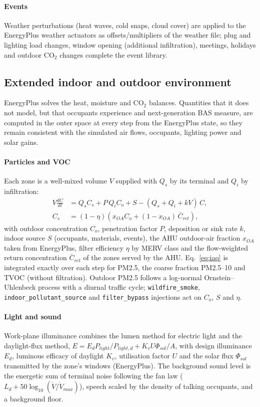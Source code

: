 \documentclass[preprint,12pt,authoryear=false]{elsarticle}
\begin{document}
\paragraph{Events} Weather perturbations (heat waves, cold snaps, cloud cover) are applied to the EnergyPlus weather
actuators as offsets/multipliers of the weather file; plug and lighting load changes, window opening (additional
infiltration), meetings, holidays and outdoor CO$_2$ changes complete the event library.

\subsection{Extended indoor and outdoor environment}
\label{sec:environment}

EnergyPlus solves the heat, moisture and CO$_2$ balances. Quantities that it does not model, but that occupants
experience and next-generation BAS measure, are computed in the outer space at every step from the EnergyPlus state,
so they remain consistent with the simulated air flows, occupants, lighting power and solar gains.

\paragraph{Particles and VOC} Each zone is a well-mixed volume $V$ supplied with $Q_s$ by its terminal and $Q_i$ by
infiltration:
\begin{align}
V\frac{dC}{dt} &= Q_s C_s + P\,Q_i C_o + S - (Q_s + Q_i + kV)\,C, \label{eq:iaq}\\
C_s &= (1-\eta)\left(x_{OA} C_o + (1-x_{OA})\,\bar C_{ret}\right), \nonumber
\end{align}
with outdoor concentration $C_o$, penetration factor $P$, deposition or sink rate $k$, indoor source $S$ (occupants,
materials, events), the AHU outdoor-air fraction $x_{OA}$ taken from EnergyPlus, filter efficiency $\eta$ by MERV class
\cite{ashrae522} and the flow-weighted return concentration $\bar C_{ret}$ of the zones served by the AHU.
Eq.~\eqref{eq:iaq} is integrated exactly over each step for PM2.5, the coarse fraction PM2.5--10 and TVOC (without
filtration). Outdoor PM2.5 follows a log-normal Ornstein--Uhlenbeck process with a diurnal traffic cycle;
\texttt{wildfire\_smoke}, \texttt{indoor\_pollutant\_source} and \texttt{filter\_bypass} injections act on $C_o$, $S$
and $\eta$.

\paragraph{Light and sound} Work-plane illuminance combines the lumen method for electric light and the daylight-flux
method, $E = E_d P_{light}/P_{light,d} + K_v U \Phi_{sol}/A$, with design illuminance $E_d$, luminous efficacy of
daylight $K_v$, utilisation factor $U$ and the solar flux $\Phi_{sol}$ transmitted by the zone's windows (EnergyPlus).
The background sound level is the energetic sum of terminal noise following the fan law
($L_{d} + 50\log_{10}(\dot V/\dot V_{max})$), speech scaled by the density of talking occupants, and a background floor.
\end{document}
